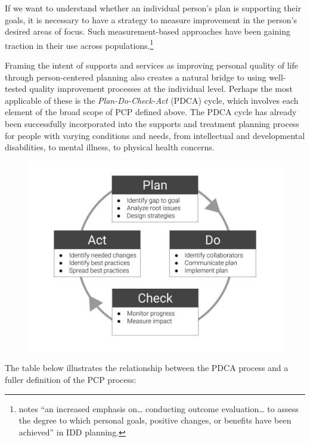 \documentclass[
]{book}
\begin{document}
If we want to understand whether an individual person's plan is supporting their goals, it is necessary to have a strategy to measure improvement in the person's desired areas of focus. Such measurement-based approaches have been gaining traction in their use across populations.\footnote{\citet{shalock-changes} notes ``an increased emphasis on\ldots{} conducting outcome evaluation\ldots{} to assess the degree to which personal goals, positive changes, or benefits have been achieved'' in IDD planning.}

Framing the intent of supports and services as improving personal quality of life through person-centered planning also creates a natural bridge to using well-tested quality improvement processes at the individual level. Perhaps the most applicable of these is the \emph{Plan-Do-Check-Act} (PDCA) cycle, which involves each element of the broad scope of PCP defined above. The PDCA cycle has already been successfully incorporated into the supports and treatment planning process for people with varying conditions and needs, from intellectual and developmental disabilities, to mental illness, to physical health concerns.

\begin{figure}
\includegraphics[width=24in]{_bookdown_files/img/pdca} \end{figure}

The table below illustrates the relationship between the PDCA process and a fuller definition of the PCP process:
\end{document}
